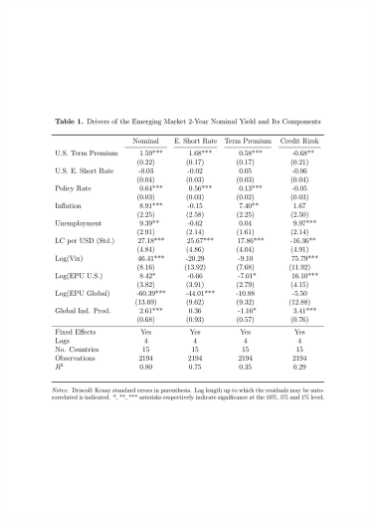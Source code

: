 \documentclass[12pt, aspectratio=169, xcolor=dvipsnames]{beamer}  %
\begin{document}
\begin{frame}
\vspace{-0.8cm}
\begin{figure}[!htbp]
	\begin{center} %
		\includegraphics[trim={2cm 7.1cm 2cm 5cm},clip, width=0.85\textwidth,height=1\textheight]{../Tables/ycdcmp2y.pdf}
		\par\end{center}
\end{figure}
\end{frame}
\end{document}
